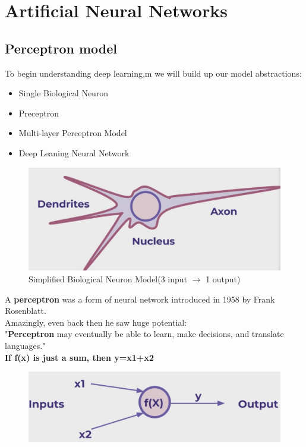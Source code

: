 \documentclass[12pt]{article}
\begin{document}
\section{Artificial Neural Networks}

\subsection{Perceptron model}
To begin understanding deep learning,m we will build up our model abstractions:\\
\begin{itemize}
	\item
	Single Biological Neuron
	\item
	Preceptron 
	\item
	Multi-layer Perceptron Model
	\item
	Deep Leaning Neural Network
\end{itemize}

\begin{figure}[htbp]	\centerline{\includegraphics[scale=.5]{img/biologicalNN.jpg}}
	\caption{Simplified Biological Neuron Model(3 input $\rightarrow$ 1 output)}
\end{figure}


A \textbf{perceptron} was a form of neural network introduced in 1958 by Frank Rosenblatt.\\
Amazingly, even back then he saw huge potential:\\
\large "\textbf{Perceptron} may eventually be able to learn, make decisions, and translate languages."
\small\\
\newpage
\textbf{If f(x) is just a sum, then y=x1+x2}
\begin{figure}[htbp]	\centerline{\includegraphics[scale=.5]{img/sumPerceptron.jpg}}
\end{figure}
\newpage
\end{document}
